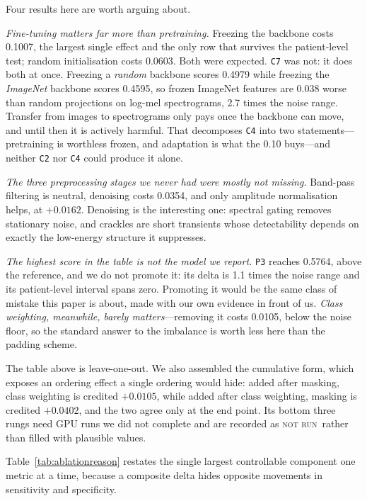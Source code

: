 \documentclass[journal,onecolumn]{IEEEtran}
\newcommand{\notrun}{\textsc{not run}}
\begin{document}
Four results here are worth arguing about.

\emph{Fine-tuning matters far more than pretraining.} Freezing the backbone costs 0.1007, the
largest single effect and the only row that survives the patient-level test; random
initialisation costs 0.0603. Both were expected. \texttt{C7} was not: it does both at once.
Freezing a \emph{random} backbone scores 0.4979 while freezing the \emph{ImageNet} backbone
scores 0.4595, so frozen ImageNet features are 0.038 worse than random projections on log-mel
spectrograms, 2.7 times the noise range. Transfer from images to spectrograms only pays once
the backbone can move, and until then it is actively harmful. That decomposes \texttt{C4} into
two statements---pretraining is worthless frozen, and adaptation is what the 0.10 buys---and
neither \texttt{C2} nor \texttt{C4} could produce it alone.

\emph{The three preprocessing stages we never had were mostly not missing.} Band-pass filtering
is neutral, denoising costs 0.0354, and only amplitude normalisation helps, at $+0.0162$.
Denoising is the interesting one: spectral gating removes stationary noise, and crackles are
short transients whose detectability depends on exactly the low-energy structure it
suppresses.

\emph{The highest score in the table is not the model we report.} \texttt{P3} reaches 0.5764,
above the reference, and we do not promote it: its delta is 1.1 times the noise range and its
patient-level interval spans zero. Promoting it would be the same class of mistake this paper
is about, made with our own evidence in front of us. \emph{Class weighting, meanwhile, barely
matters}---removing it costs 0.0105, below the noise floor, so the standard answer to the
imbalance is worth less here than the padding scheme.

The table above is leave-one-out. We also assembled the cumulative form, which exposes an
ordering effect a single ordering would hide: added after masking, class weighting is credited
$+0.0105$, while added after class weighting, masking is credited $+0.0402$, and the two agree
only at the end point. Its bottom three rungs need GPU runs we did not complete and are recorded
as \notrun\ rather than filled with plausible values.

Table~\ref{tab:ablationreason} restates the single largest controllable component one metric at
a time, because a composite delta hides opposite movements in sensitivity and specificity.
\end{document}
